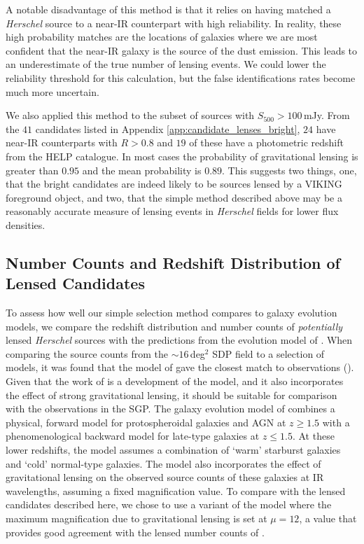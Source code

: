 A notable disadvantage of this method is that it relies on having matched a \textit{Herschel} source to a near-IR counterpart with high reliability. In reality, these high probability matches are the locations of galaxies where we are most confident that the near-IR galaxy is the source of the dust emission. This leads to an underestimate of the true number of lensing events. We could lower the reliability threshold for this calculation, but the false identifications rates become much more uncertain.

We also applied this method to the subset of sources with $S_{500} > 100\,$mJy. From the $41$ candidates listed in Appendix \ref{app:candidate_lenses_bright}, $24$ have near-IR counterparts with $R > 0.8$ and $19$ of these have a photometric redshift from the HELP catalogue. In most cases the probability of gravitational lensing is greater than $0.95$ and the mean probability is $0.89$. This suggests two things, one, that the bright candidates are indeed likely to be sources lensed by a VIKING foreground object, and two, that the simple method described above may be a reasonably accurate measure of lensing events in \textit{Herschel} fields for lower flux densities.

\subsection{Number Counts and Redshift Distribution of Lensed Candidates}
\label{sec:lensed_number_counts}

To assess how well our simple selection method compares to galaxy evolution models, we compare the redshift distribution and number counts of \textit{potentially} lensed \textit{Herschel} sources with the predictions from the evolution model of \citealt{Cai_2013}. When comparing the source counts from the $\sim 16\,$deg$^2$ SDP field to a selection of models, it was found that the model of \citealt{Negrello_2007} gave the closest match to observations (\citealt{Clements_2010}). Given that the work of \citealt{Cai_2013} is a development of the \citealt{Negrello_2007} model, and it also incorporates the effect of strong gravitational lensing, it should be suitable for comparison with the observations in the SGP. The galaxy evolution model of \citealt{Cai_2013} combines a physical, forward model for protospheroidal galaxies and AGN at $z \geq 1.5$ with a phenomenological backward model for late-type galaxies at $z \leq 1.5$. At these lower redshifts, the model assumes a combination of `warm' starburst galaxies and `cold' normal-type galaxies. The model also incorporates the effect of gravitational lensing on the observed source counts of these galaxies at IR wavelengths, assuming a fixed magnification value. To compare with the lensed candidates described here, we chose to use a variant of the \citealt{Cai_2013} model where the maximum magnification due to gravitational lensing is set at $\mu = 12$, a value that provides good agreement with the lensed number counts of \citealt{Negrello_2017}.

